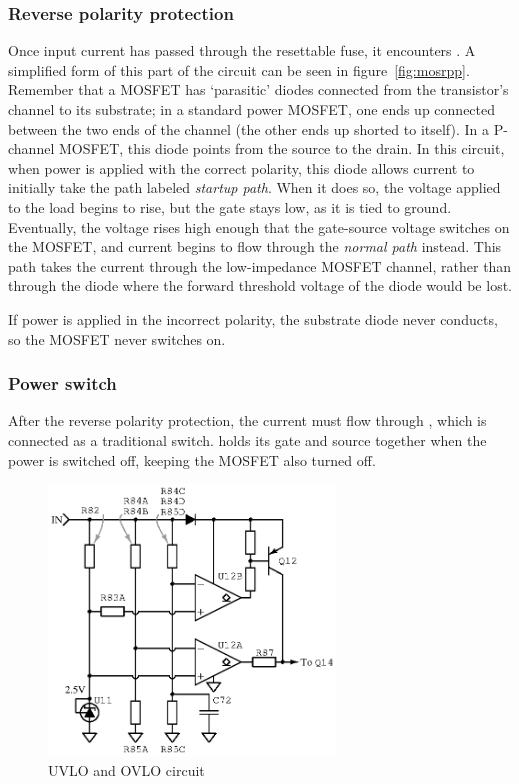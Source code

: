\subsubsection{Reverse polarity protection}

Once input current has passed through the resettable fuse, it encounters
. A simplified form of this part of the circuit can be seen in
figure~\ref{fig:mosrpp}. Remember that a MOSFET has `parasitic' diodes
connected from the transistor's channel to its substrate; in a
standard power MOSFET, one ends up connected between the two ends of the
channel (the other ends up shorted to itself). In a P-channel MOSFET, this
diode points from the source to the drain. In this circuit, when power is
applied with the correct polarity, this diode allows current to initially take
the path labeled \emph{startup path}. When it does so, the voltage applied to
the load begins to rise, but the gate stays low, as it is tied to ground.
Eventually, the voltage rises high enough that the gate-source voltage switches
on the MOSFET, and current begins to flow through the \emph{normal path}
instead. This path takes the current through the low-impedance MOSFET channel,
rather than through the diode where the forward threshold voltage of the diode
would be lost.

If power is applied in the incorrect polarity, the substrate diode never
conducts, so the MOSFET never switches on.

\subsubsection{Power switch}

After the reverse polarity protection, the current must flow through
, which is connected as a traditional switch.  holds
its gate and source together when the power is switched off, keeping the MOSFET
also turned off.

\begin{figure}[H]
\centering
\includegraphics[width=3in]{comparator}
\caption{UVLO and OVLO circuit}
\label{fig:uovlo}
\end{figure}

